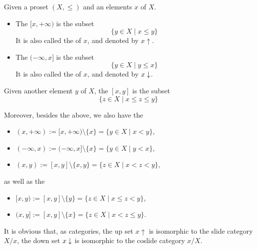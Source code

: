   \begin{defn}
    Given a proset $(X,\leqslant)$ and an elements $x$ of $X$.
    \begin{itemize}
      \item The  $[x,+\infty)$ is the subset
                 \begin{equation*}
                 \{y\in X\mid x\leqslant y\}
                 \end{equation*}
                 It is also called the  of $x$, and denoted by $x\uparrow$.
      \item The  $(-\infty,x]$ is the subset
                 \begin{equation*}
                 \{y\in X\mid y\leqslant x\}
                 \end{equation*}
                 It is also called the  of $x$, and denoted by $x\downarrow$.
    \end{itemize}
    Given another element $y$ of $X$, the  $[x,y]$ is the subset
    \begin{equation*}
      \{z\in X\mid x\leqslant z\leqslant y\}
    \end{equation*}

    Moreover, besides the  above, we also have the 
    \begin{itemize}
      \item $(x,+\infty):=[x,+\infty)\setminus\{x\}=\{y\in X\mid x<y\}$,
      \item $(-\infty,x):=(-\infty,x]\setminus\{x\}=\{y\in X\mid y<x\}$,
      \item $(x,y):=[x,y]\setminus\{x,y\}=\{z\in X\mid x<z<y\}$,
    \end{itemize}
    as well as the 
    \begin{itemize}
      \item $[x,y):=[x,y]\setminus\{y\}=\{z\in X\mid x\leqslant z<y\}$,
      \item $(x,y]:=[x,y]\setminus\{x\}=\{z\in X\mid x<z\leqslant y\}$.
    \end{itemize}
  \end{defn}
  It is obvious that, as categories, the up set $x\uparrow$ is isomorphic to the slide category $X/x$, the down set $x\downarrow$ is isomorphic to the coslide category $x/X$.

